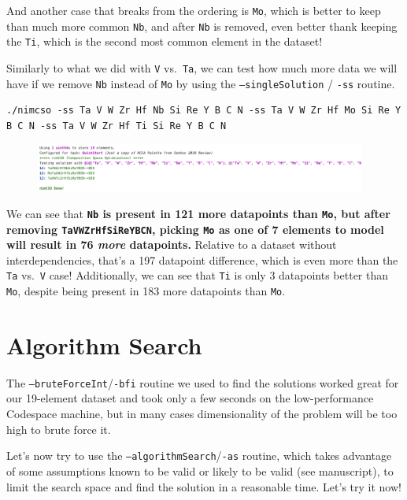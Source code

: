 And another case that breaks from the ordering is
\texttt{Mo}, which is better to keep than much more
common \texttt{Nb}, and after
\texttt{Nb} is removed, even better thank keeping the
\texttt{Ti}, which is the second most common element in
the dataset!

Similarly to what we did with \texttt{V}
vs.~\texttt{Ta}, we can test how much more data we will
have if we remove \texttt{Nb} instead of
\texttt{Mo} by using the
\texttt{--singleSolution} /
\texttt{-ss} routine.

\begin{verbatim}
./nimcso -ss Ta V W Zr Hf Nb Si Re Y B C N -ss Ta V W Zr Hf Mo Si Re Y B C N -ss Ta V W Zr Hf Ti Si Re Y B C N
\end{verbatim}

\begin{figure}[H]
  \centering
  \includegraphics[width=0.97\textwidth]{nimcsotutorial/6.png}
\end{figure}

We can see that \textbf{\texttt{Nb} is present in 121
more datapoints than \texttt{Mo}, but after removing
\texttt{TaVWZrHfSiReYBCN}, picking
\texttt{Mo} as one of 7 elements to model will result
in 76 \emph{more} datapoints.} Relative to a dataset without
interdependencies, that's a 197 datapoint difference, which is even more
than the \texttt{Ta} vs.~\texttt{V}
case! Additionally, we can see that \texttt{Ti} is only
3 datapoints better than \texttt{Mo}, despite being
present in 183 more datapoints than \texttt{Mo}.

\hypertarget{algorithm-search}{%
\section{Algorithm Search}\label{nimcsotutorial:algorithm-search}}

The
\texttt{--bruteForceInt}/\texttt{-bfi}
routine we used to find the solutions worked great for our 19-element
dataset and took only a few seconds on the low-performance Codespace
machine, but in many cases dimensionality of the problem will be too
high to brute force it.

Let's now try to use the
\texttt{--algorithmSearch}/\texttt{-as}
routine, which takes advantage of some assumptions known to be valid or
likely to be valid (see manuscript), to limit the search space and find
the solution in a reasonable time. Let's try it now!


